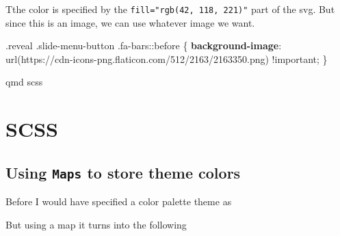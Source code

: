 \documentclass[
  letterpaper,
  DIV=11,
  numbers=noendperiod]{scrreprt}
\newenvironment{Shaded}{\begin{snugshade}}{\end{snugshade}}
\newcommand{\AttributeTok}[1]{\textcolor[rgb]{0.40,0.45,0.13}{#1}}
\newcommand{\ConstantTok}[1]{\textcolor[rgb]{0.56,0.35,0.01}{#1}}
\newcommand{\FunctionTok}[1]{\textcolor[rgb]{0.28,0.35,0.67}{#1}}
\newcommand{\InformationTok}[1]{\textcolor[rgb]{0.37,0.37,0.37}{#1}}
\newcommand{\KeywordTok}[1]{\textcolor[rgb]{0.00,0.23,0.31}{\textbf{#1}}}
\newcommand{\NormalTok}[1]{\textcolor[rgb]{0.00,0.23,0.31}{#1}}
\newcommand{\OperatorTok}[1]{\textcolor[rgb]{0.37,0.37,0.37}{#1}}
\newcommand{\StringTok}[1]{\textcolor[rgb]{0.13,0.47,0.30}{#1}}
\newcommand{\VariableTok}[1]{\textcolor[rgb]{0.07,0.07,0.07}{#1}}
\begin{document}
Tthe color is specified by the \texttt{fill="rgb(42,\ 118,\ 221)"} part
of the svg. But since this is an image, we can use whatever image we
want.

\begin{Shaded}
\begin{Highlighting}[]
\FunctionTok{.reveal} \FunctionTok{.slide{-}menu{-}button} \FunctionTok{.fa{-}bars}\InformationTok{::before}\NormalTok{ \{}
\KeywordTok{background{-}image}\NormalTok{: }\FunctionTok{url(}\StringTok{\textquotesingle{}https://cdn{-}icons{-}png.flaticon.com/512/2163/2163350.png\textquotesingle{}}\FunctionTok{)} \AttributeTok{!important}\OperatorTok{;}
\NormalTok{\}}
\end{Highlighting}
\end{Shaded}

qmd scss

\chapter{SCSS}\label{scss}

\section{\texorpdfstring{Using \texttt{Maps} to store theme
colors}{Using Maps to store theme colors}}\label{using-maps-to-store-theme-colors}

Before I would have specified a color palette theme as

\begin{Shaded}
\end{Shaded}

But using a map it turns into the following

\begin{Shaded}
\end{Shaded}
\end{document}
